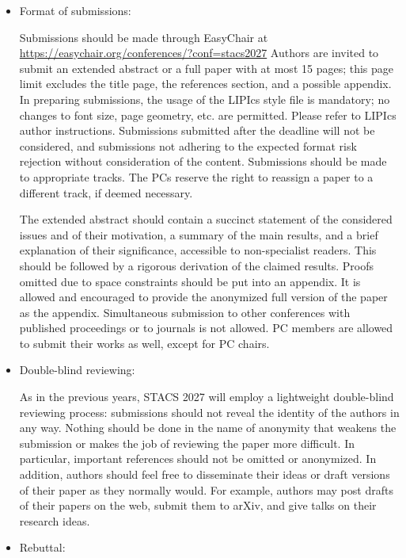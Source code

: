 \documentclass[prodmode,acmtecs]{acmsmall} %
\begin{document}
\begin{itemize}
\item  Format of submissions: 
 
  Submissions should be made through EasyChair at \href{https://easychair.org/conferences/?conf=stacs2027}{https://easychair.org/conferences/?conf=stacs2027} Authors are invited to submit an extended abstract or a full paper with at most 15 pages; this page limit excludes the title page, the references section, and a possible appendix. In preparing submissions, the usage of the LIPIcs style file is mandatory; no changes to font size, page geometry, etc. are permitted. Please refer to LIPIcs author instructions. Submissions submitted after the deadline will not be considered, and submissions not adhering to the expected format risk rejection without consideration of the content. Submissions should be made to appropriate tracks. The PCs reserve the right to reassign a paper to a different track, if deemed necessary. 
 
  The extended abstract should contain a succinct statement of the considered issues and of their motivation, a summary of the main results, and a brief explanation of their significance, accessible to non-specialist readers. This should be followed by a rigorous derivation of the claimed results. Proofs omitted due to space constraints should be put into an appendix. It is allowed and encouraged to provide the anonymized full version of the paper as the appendix. Simultaneous submission to other conferences with published proceedings or to journals is not allowed. PC members are allowed to submit their works as well, except for PC chairs.                                                            
 
\item  Double-blind reviewing: 
 
  As in the previous years, STACS 2027 will employ a lightweight double-blind reviewing process: submissions should not reveal the identity of the authors in any way. Nothing should be done in the name of anonymity that weakens the submission or makes the job of reviewing the paper more difficult. In particular, important references should not be omitted or anonymized. In addition, authors should feel free to disseminate their ideas or draft versions of their paper as they normally would. For example, authors may post drafts of their papers on the web, submit them to arXiv, and give talks on their research ideas. 
 
\item  Rebuttal:                                              
 

\end{itemize}
\end{document}

